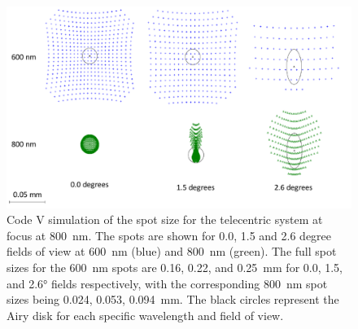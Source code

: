 \begin{figure}[h!]
    \begin{center}
    \includegraphics[width=1.0\textwidth]{./Images/3-2-TelecentricSpotSize.pdf}
    \caption[Telecentric Prototype Spot Sizes]{Code V simulation of the spot size for the telecentric system at focus at 800~nm. The spots are shown for 0.0, 1.5 and 2.6 degree fields of view at 600~nm (blue) and 800~nm (green). The full spot sizes for the 600~nm spots are 0.16, 0.22, and 0.25~mm for 0.0, 1.5, and 2.6\si{\degree} fields respectively, with the corresponding 800~nm spot sizes being 0.024, 0.053, 0.094~mm. The black circles represent the Airy disk for each specific wavelength and field of view.}
    \label{fig:3.2:telecentricSpotSize}
    \end{center}
\end{figure}

